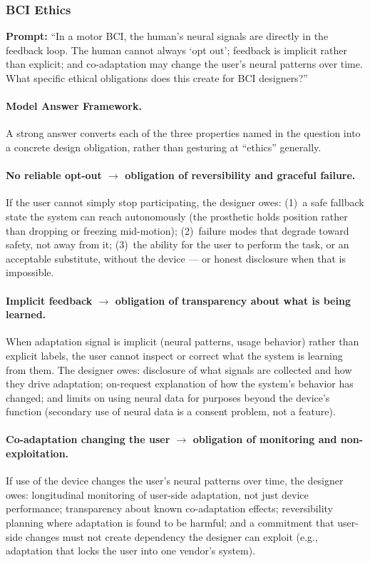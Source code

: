 \subsubsection{BCI Ethics}

\textbf{Prompt:} ``In a motor BCI, the human's neural signals are directly in the feedback loop. The human cannot always `opt out'; feedback is implicit rather than explicit; and co-adaptation may change the user's neural patterns over time. What specific ethical obligations does this create for BCI designers?''

\paragraph{Model Answer Framework.}

A strong answer converts each of the three properties named in the question into a concrete design obligation, rather than gesturing at ``ethics'' generally.

\paragraph{No reliable opt-out $\to$ obligation of reversibility and graceful failure.}
If the user cannot simply stop participating, the designer owes: (1)~a safe fallback state the system can reach autonomously (the prosthetic holds position rather than dropping or freezing mid-motion); (2)~failure modes that degrade toward safety, not away from it; (3)~the ability for the user to perform the task, or an acceptable substitute, without the device --- or honest disclosure when that is impossible.

\paragraph{Implicit feedback $\to$ obligation of transparency about what is being learned.}
When adaptation signal is implicit (neural patterns, usage behavior) rather than explicit labels, the user cannot inspect or correct what the system is learning from them. The designer owes: disclosure of what signals are collected and how they drive adaptation; on-request explanation of how the system's behavior has changed; and limits on using neural data for purposes beyond the device's function (secondary use of neural data is a consent problem, not a feature).

\paragraph{Co-adaptation changing the user $\to$ obligation of monitoring and non-exploitation.}
If use of the device changes the user's neural patterns over time, the designer owes: longitudinal monitoring of user-side adaptation, not just device performance; transparency about known co-adaptation effects; reversibility planning where adaptation is found to be harmful; and a commitment that user-side changes must not create dependency the designer can exploit (e.g., adaptation that locks the user into one vendor's system).

